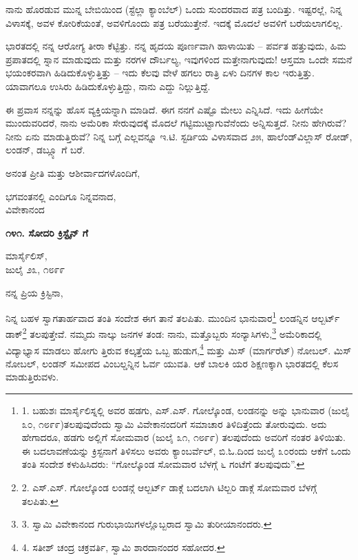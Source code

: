 ನಾನು ಹೊರಡುವ ಮುನ್ನ ಬೇಬಿಯಿಂದ (ಸ್ಟೆಲ್ಲಾ ಕ್ಯಾಂಬೆಲ್) ಒಂದು ಸುಂದರವಾದ ಪತ್ರ ಬಂದಿತ್ತು. ಇಷ್ಟರಲ್ಲೆ, ನಿನ್ನ ವಿಳಾಸಕ್ಕೆ, ಅವಳ ಕೋರಿಕೆಯಂತೆ, ಅವಳಿಗೊಂದು ಪತ್ರ ಬರೆಯುತ್ತೇನೆ. ಇದಕ್ಕೆ ಮೊದಲೆ ಅವಳಿಗೆ ಬರೆಯಲಾಗಲಿಲ್ಲ.

ಭಾರತದಲ್ಲಿ ನನ್ನ ಆರೋಗ್ಯ ತೀರಾ ಕೆಟ್ಟಿತ್ತು. ನನ್ನ ಹೃದಯ ಪೂರ್ಣವಾಗಿ ಹಾಳಾಯಿತು – ಪರ್ವತ ಹತ್ತುವುದು, ಹಿಮ ಪ್ರಪಾತದಲ್ಲಿ ಸ್ನಾನ ಮಾಡುವುದು ಮತ್ತು ನರಗಳ ದೌರ್ಬಲ್ಯ, ಇವುಗಳಿಂದ ಮತ್ತೇನಾಗುವುದು! ಆಸ್ತಮಾ ಒಂದೇ ಸಮನೆ ಭಯಂಕರವಾಗಿ ಹಿಡಿದುಕೊಳ್ಳುತ್ತಿತ್ತು – ಇದು ಕೆಲವು ವೇಳೆ ಹಗಲು ರಾತ್ರಿ ಏಳು ದಿನಗಳ ಕಾಲ ಇರುತ್ತಿತ್ತು. ಯಾವಾಗಲೂ ಉಸಿರು ಹಿಡಿದುಕೊಳ್ಳುತ್ತಿದ್ದು, ನಾನು ಎದ್ದು ನಿಲ್ಲುತ್ತಿದ್ದೆ.

ಈ ಪ್ರವಾಸ ನನ್ನನ್ನು ಹೊಸ ವ್ಯಕ್ತಿಯನ್ನಾಗಿ ಮಾಡಿದೆ. ಈಗ ನನಗೆ ಎಷ್ಟೊ ಮೇಲು ಎನ್ನಿಸಿದೆ. ಇದು ಹೀಗೆಯೇ ಮುಂದುವರಿದರೆ, ನಾನು ಅಮೆರಿಕಾ ಸೇರುವುದಕ್ಕೆ ಮೊದಲೆ ಗಟ್ಟಿಮುಟ್ಟಾಗುವೆನೆಂದು ಅನ್ನಿಸುತ್ತದೆ. ನೀನು ಹೇಗಿರುವೆ? ನೀನು ಏನು ಮಾಡುತ್ತಿರುವೆ? ನಿನ್ನ ಬಗ್ಗೆ ಎಲ್ಲವನ್ನೂ ಇ.ಟಿ. ಸ್ಟರ್ಡಿಯ ವಿಳಾಸವಾದ ೨೫, ಹಾಲೆಂಡ್‌ವಿಲ್ಲಾಸ್ ರೋಡ್, ಲಂಡನ್, ಡಬ್ಲ್ಯೂ ಗೆ ಬರೆ.

ಅನಂತ ಪ್ರೀತಿ ಮತ್ತು ಆಶೀರ್ವಾದಗಳೊಂದಿಗೆ,

\begin{flushright}
ಭಗವಂತನಲ್ಲಿ ಎಂದಿಗೂ ನಿನ್ನವನಾದ,\\ವಿವೇಕಾನಂದ
\end{flushright}

\begin{center}
\textbf{೧೪೧. ಸೋದರಿ ಕ್ರಿಸ್ಟೈನ್ ಗೆ}
\end{center}

\begin{flushright}
ಮಾರ್ಸೈಲಿಸ್,\\ಜುಲೈ ೨೩, ೧೮೯೯
\end{flushright}

ನನ್ನ ಪ್ರಿಯ ಕ್ರಿಸ್ಟಿನಾ,

ನಿನ್ನ ಬಹಳ ಸ್ವಾಗತಾರ್ಹವಾದ ತಂತಿ ಸಂದೇಶ ಈಗ ತಾನೆ ತಲಪಿತು. ಮುಂದಿನ ಭಾನುವಾರ\footnote{1. ಬಹುಶಃ ಮಾರ್ಸೈಲಿಸ್ನಲ್ಲಿ ಅವರ ಹಡಗು, ಎಸ್.ಎಸ್. ಗೋಲ್ಕೊಂಡ, ಲಂಡನನ್ನು ಅನ್ನು ಭಾನುವಾರ (ಜುಲೈ ೩೦, ೧೮೯೯)ತಲಪುವುದೆಂದು ಸ್ವಾಮಿ ವಿವೇಕಾನಂದರಿಗೆ ಸಮಾಚಾರ ತಿಳಿದಿತ್ತೆಂದು ತೋರುವುದು. ಅದು ಹೇಗಾದರೂ, ಹಡಗು ಅಲ್ಲಿಗೆ ಸೋಮವಾರ (ಜುಲೈ ೩೧, ೧೮೯೯) ತಲಪುದೆಂದು ಅವರಿಗೆ ನಂತರ ತಿಳಿಯಿತು. ಈ ಬದಲಾವಣೆಯನ್ನು ಕ್ರಿಸ್ಟನಾಗೆ ತಿಳಿಸಲು ಅವರು ಕ್ಯಾಂಬರ್ವೆಲ್, ಬಿ.ಓ.ದಿಂದ ಜುಲೈ ೩೦ರಂದು ಆಕೆಗೆ ಒಂದು ತಂತಿ ಸಂದೇಶ ಕಳುಹಿಸಿದರು: “ಗೋಲ್ಕೊಂಡ ಸೋಮವಾರ ಬೆಳಗ್ಗೆ ೬ ಗಂಟೆಗೆ ತಲಪುವುದು”.} ಲಂಡನ್ನಿನ ಆಲ್ಬರ್ಟ್ ಡಾಕ್\footnote{2. ಎಸ್.ಎಸ್. ಗೋಲ್ಕೊಂಡ ಲಂಡನ್ಗೆ ಆಲ್ಬರ್ಟ್ ಡಾಕ್ಗೆ ಬದಲಾಗಿ ಟಿಲ್ಬರಿ ಡಾಕ್ಗೆ ಸೋಮವಾರ ಬೆಳಗ್ಗೆ ತಲಪಿತು.} ತಲಪುತ್ತೇವೆ. ನಮ್ಮದು ನಾಲ್ಕು ಜನಗಳ ತಂಡ: ನಾನು, ಮತ್ತೊಬ್ಬರು ಸಂನ್ಯಾಸಿಗಳು,\footnote{3. ಸ್ವಾಮಿ ವಿವೇಕಾನಂದ ಗುರುಭಾಯಿಗಳಲ್ಲೊಬ್ಬರಾದ ಸ್ವಾಮಿ ತುರೀಯಾನಂದರು.} ಅಮೆರಿಕಾದಲ್ಲಿ ವಿದ್ಯಾಭ್ಯಾಸ ಮಾಡಲು ಹೋಗು ತ್ತಿರುವ ಕಲ್ಕತ್ತೆಯ ಒಬ್ಬ ಹುಡುಗ,\footnote{4. ಸತೀಶ್ ಚಂದ್ರ ಚಕ್ರವರ್ತಿ, ಸ್ವಾಮಿ ಶಾರದಾನಂದರ ಸಹೋದರ.} ಮತ್ತು ಮಿಸ್ (ಮಾರ್ಗರೆಟ್) ನೋಬಲ್. ಮಿಸ್ ನೋಬಲ್, ಲಂಡನ್ ಸಮೀಪದ ವಿಂಬಲ್ಡನ್ನಿನ ಓರ್ವ ಯುವತಿ. ಆಕೆ ಬಾಲಕಿ ಯರ ಶಿಕ್ಷಣಕ್ಕಾಗಿ ಭಾರತದಲ್ಲಿ ಕೆಲಸ ಮಾಡುತ್ತಿರುವಳು.


